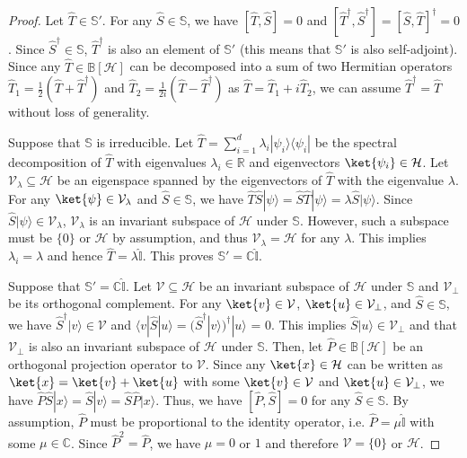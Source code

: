 \documentclass[preprint,pteplogo]{ptephy_v2}%
\numberwithin{equation}{section}
\theoremstyle{definition}
\newcommand{\mc}[1]{\mathcal{#1}}
\newcommand{\mbb}[1]{\mathbb{#1}}
\begin{document}
\begin{proof}
Let $\hat{T} \in \mbb{S}'$.
For any $\hat{S} \in \mbb{S}$, we have $[\hat{T}, \hat{S}]=0$ and $[\hat{T}^\dagger, \hat{S}^\dagger] = [\hat{S}, \hat{T}]^\dagger = 0$. 
Since $\hat{S}^\dagger \in \mbb{S}$, $\hat{T}^\dagger$ is also an element of $\mbb{S}'$ (this means that $\mbb{S}'$ is also self-adjoint).
Since any $\hat{T} \in \mbb{B}[\mc{H}]$ can be decomposed into a sum of two Hermitian operators $\hat{T}_1 = \frac{1}{2}(\hat{T} + \hat{T}^\dagger)$ and $\hat{T}_2 = \frac{1}{2i}(\hat{T} - \hat{T}^\dagger)$ as $\hat{T} = \hat{T}_1 + i\hat{T}_2$, we can assume $\hat{T}^\dagger = \hat{T}$ without loss of generality.

Suppose that $\mbb{S}$ is irreducible.
Let $\hat{T} = \sum_{i=1}^d \lambda_i | \psi_i \rangle \langle \psi_i |$ be the spectral decomposition of $\hat{T}$ with eigenvalues $\lambda_i \in \mbb{R}$ and eigenvectors $\ket{\psi_i} \in \mc{H}$.
Let $\mc{V}_\lambda \subseteq \mc{H}$ be an eigenspace spanned by the eigenvectors of $\hat{T}$ with the eigenvalue $\lambda$.
For any $\ket{\psi} \in \mc{V}_\lambda$ and $\hat{S} \in \mbb{S}$, we have $\hat{T} \hat{S} | \psi \rangle = \hat{S} \hat{T} | \psi \rangle = \lambda \hat{S} | \psi \rangle$.
Since $\hat{S} | \psi \rangle \in \mc{V}_\lambda$, $\mc{V}_\lambda$ is an invariant subspace of $\mc{H}$ under $\mbb{S}$.
However, such a subspace must be $\{0\}$ or $\mc{H}$ by assumption, and thus $\mc{V}_\lambda = \mc{H}$ for any $\lambda$.
This implies $\lambda_i = \lambda$ and hence $\hat{T} = \lambda \hat{\mbb{I}}$. 
This proves $\mbb{S}' = \mbb{C} \hat{\mbb{I}}$.

Suppose that $\mbb{S}' = \mbb{C} \hat{\mbb{I}}$.
Let $\mc{V} \subseteq \mc{H}$ be an invariant subspace of $\mc{H}$ under $\mbb{S}$ and $\mc{V}_\perp$ be its orthogonal complement.
For any $\ket{v} \in \mc{V}$, $\ket{u} \in \mc{V}_\perp$, and $\hat{S} \in \mbb{S}$, we have $\hat{S}^\dagger | v \rangle \in \mc{V}$ and $\langle v | \hat{S} | u \rangle = (\hat{S}^\dagger | v \rangle)^\dagger | u \rangle$ = 0. 
This implies $\hat{S} | u \rangle \in \mc{V}_\perp$ and that $\mc{V}_\perp$ is also an invariant subspace of $\mc{H}$ under $\mbb{S}$.
Then, let $\hat{P} \in \mbb{B}[\mc{H}]$ be an orthogonal projection operator to $\mc{V}$.
Since any $\ket{x} \in \mc{H}$ can be written as $\ket{x} = \ket{v}+\ket{u}$ with some $\ket{v} \in \mc{V}$ and $\ket{u} \in \mc{V}_\perp$, we have $\hat{P} \hat{S} | x \rangle = \hat{S} | v \rangle = \hat{S} \hat{P} | x \rangle$. 
Thus, we have $[\hat{P}, \hat{S}] = 0$ for any $\hat{S} \in \mbb{S}$.
By assumption, $\hat{P}$ must be proportional to the identity operator, i.e. $\hat{P} = \mu \hat{\mbb{I}}$ with some $\mu \in \mbb{C}$. 
Since $\hat{P}^2 = \hat{P}$, we have $\mu=0$ or $1$ and therefore $\mc{V} = \{0\}$ or $\mc{H}$.
\end{proof}
\end{document}
